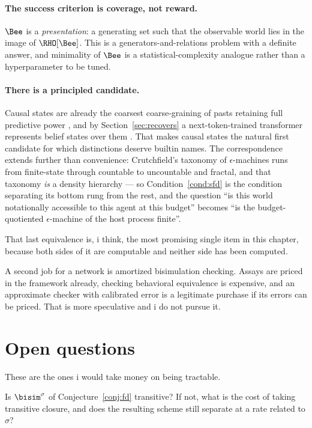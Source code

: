 \paragraph{The success criterion is coverage, not reward.}
$\Bee$ is a \emph{presentation}: a generating set such that the
observable world lies in the image of $\RHO[\Bee]$.
This is a generators-and-relations problem with a definite answer,
and minimality of $\Bee$ is a statistical-complexity analogue
rather than a hyperparameter to be tuned.

\paragraph{There is a principled candidate.}
Causal states are already the coarsest coarse-graining of pasts
retaining full predictive power \cite{shalizi2001}, and by
Section~\ref{sec:recovers} a next-token-trained transformer
represents belief states over them \cite{shai2024}.
That makes causal states the natural first candidate for which
distinctions deserve builtin names.
The correspondence extends further than convenience: Crutchfield's
taxonomy of $\epsilon$-machines runs from finite-state through
countable to uncountable and fractal, and that taxonomy \emph{is} a
density hierarchy --- so Condition~\ref{cond:sfd} is the condition
separating its bottom rung from the rest, and the question ``is
this world notationally accessible to this agent at this budget''
becomes ``is the budget-quotiented $\epsilon$-machine of the host
process finite''.

That last equivalence is, i think, the most promising single item
in this chapter, because both sides of it are computable and
neither side has been computed.

A second job for a network is amortized bisimulation checking.
Assays are priced in the framework already, checking behavioral
equivalence is expensive, and an approximate checker with
calibrated error is a legitimate purchase if its errors can be
priced.
That is more speculative and i do not pursue it.

\section{Open questions}
\label{sec:notation-open}

These are the ones i would take money on being tractable.

\begin{question}
\label{q:trans}
Is $\bisim^{\sigma}$ of Conjecture~\ref{conj:fd} transitive?
If not, what is the cost of taking transitive closure, and does the
resulting scheme still separate at a rate related to $\sigma$?
\end{question}

